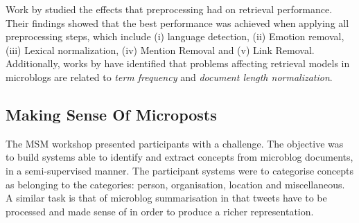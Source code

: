 Work by \cite{thomassearching} studied the effects that preprocessing had on retrieval performance. Their findings showed that the best performance was achieved when applying all preprocessing steps, which include (i) language detection, (ii) Emotion removal, (iii) Lexical normalization, (iv) Mention Removal and (v) Link Removal. Additionally, works by \cite{ferguson2012investigation,naveed2011searching} have identified that problems affecting retrieval models in microblogs are related to \textit{term frequency} and \textit{document length normalization}.





\subsection{Making Sense Of Microposts}
The MSM workshop \cite{basave2013making} presented participants with a challenge. The objective was to build systems able to identify and extract concepts from microblog documents, in a semi-supervised manner. The participant systems were to categorise concepts as belonging to the categories: person, organisation, location and miscellaneous. A similar task is that of microblog summarisation \cite{5590862} in that tweets have to be processed and made sense of in order to produce a richer representation.

